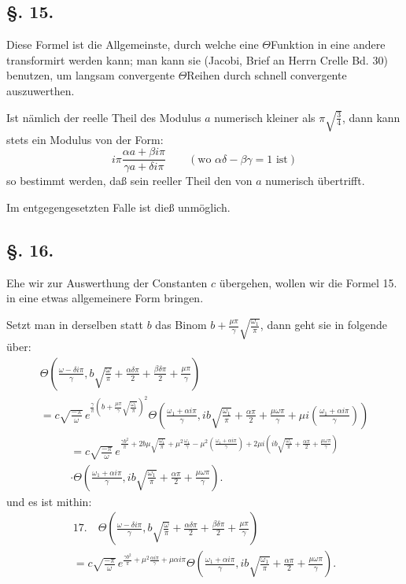 \documentclass[10pt]{article}
\begin{document}
\subsection*{\S. 15.}
Diese Formel ist die Allgemeinste, durch welche eine \(\Theta\)Funktion in eine andere transformirt werden kann; man kann sie (Jacobi, Brief an Herrn Crelle Bd. 30) benutzen, um langsam convergente \(\Theta\)Reihen durch schnell convergente auszuwerthen.

Ist nämlich der reelle Theil des Modulus \(a\) numerisch kleiner als \(\pi\sqrt{\frac{3}{4}}\), dann kann stets ein Modulus von der Form:
\[
i\pi\frac{\alpha a+\beta i\pi}{\gamma a+\delta i\pi}
\qquad(\text{wo }\alpha\delta-\beta\gamma=1\text{ ist})
\]
so bestimmt werden, daß sein reeller Theil den von \(a\) numerisch übertrifft.

Im entgegengesetzten Falle ist dieß unmöglich.

\subsection*{\S. 16.}
Ehe wir zur Auswerthung der Constanten \(c\) übergehen, wollen wir die Formel 15. in eine etwas allgemeinere Form bringen.

Setzt man in derselben statt \(b\) das Binom \(b+\frac{\mu\pi}{\gamma}\sqrt{\frac{\omega_1}{\pi}}\), dann geht sie in folgende über:
\begin{multline*}
\Theta\!\left(\frac{\omega-\delta i\pi}{\gamma}, b\sqrt{\frac{\omega}{\pi}}+\frac{\alpha\delta\pi}{2}+\frac{\beta\delta\pi}{2}+\frac{\mu\pi}{\gamma}\right)\\
=c\sqrt{\frac{-\pi}{\omega}}\,e^{\frac{\gamma}{\pi}\left(b+\frac{\mu\pi}{\gamma}\sqrt{\frac{\omega_1}{\pi}}\right)^2}
\Theta\!\left(\frac{\omega_1+\alpha i\pi}{\gamma}, ib\sqrt{\frac{\omega_1}{\pi}}+\frac{\alpha\pi}{2}+\frac{\mu\omega\pi}{\gamma}+\mu i\left(\frac{\omega_1+\alpha i\pi}{\gamma}\right)\right)
\end{multline*}
\begin{multline*}
=c\sqrt{\frac{-\pi}{\omega}}\,
 e^{\frac{\gamma b^2}{\pi}+2b\mu\sqrt{\frac{\omega_1}{\pi}}+\mu^{2}\frac{\omega_1}{\gamma}-\mu^{2}\left(\frac{\omega_1+\alpha i\pi}{\gamma}\right)
+2\mu i\left(ib\sqrt{\frac{\omega_1}{\pi}}+\frac{\alpha\pi}{2}+\frac{\mu\omega\pi}{\gamma}\right)}\\
\cdot\Theta\!\left(\frac{\omega_1+\alpha i\pi}{\gamma}, ib\sqrt{\frac{\omega_1}{\pi}}+\frac{\alpha\pi}{2}+\frac{\mu\omega\pi}{\gamma}\right).
\end{multline*}
und es ist mithin:
\begin{multline*}
17.\quad
\Theta\!\left(\frac{\omega-\delta i\pi}{\gamma}, b\sqrt{\frac{\omega}{\pi}}+\frac{\alpha\delta\pi}{2}+\frac{\beta\delta\pi}{2}+\frac{\mu\pi}{\gamma}\right)\\
=c\sqrt{\frac{-\pi}{\omega}}\,e^{\frac{\gamma b^{2}}{\pi}+\mu^{2}\frac{\alpha i\pi}{\gamma}+\mu\alpha i\pi}
\Theta\!\left(\frac{\omega_1+\alpha i\pi}{\gamma}, ib\sqrt{\frac{\omega_1}{\pi}}+\frac{\alpha\pi}{2}+\frac{\mu\omega\pi}{\gamma}\right).
\end{multline*}
\end{document}
